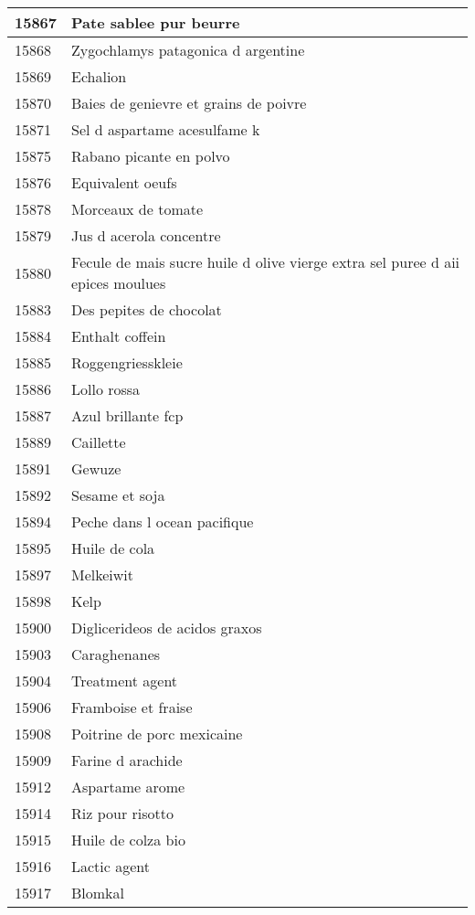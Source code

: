 \begin{longtable}{|l|l|}
15867 & Pate sablee pur beurre \\ \hline 
15868 & Zygochlamys patagonica d argentine \\ \hline 
15869 & Echalion \\ \hline 
15870 & Baies de genievre et grains de poivre \\ \hline 
15871 & Sel d aspartame acesulfame k \\ \hline 
15875 & Rabano picante en polvo \\ \hline 
15876 & Equivalent oeufs \\ \hline 
15878 & Morceaux de tomate \\ \hline 
15879 & Jus d acerola concentre \\ \hline 
15880 & Fecule de mais sucre huile d olive vierge extra sel puree d aii epices moulues \\ \hline 
15883 & Des pepites de chocolat \\ \hline 
15884 & Enthalt coffein \\ \hline 
15885 & Roggengriesskleie \\ \hline 
15886 & Lollo rossa \\ \hline 
15887 & Azul brillante fcp \\ \hline 
15889 & Caillette \\ \hline 
15891 & Gewuze \\ \hline 
15892 & Sesame et soja \\ \hline 
15894 & Peche dans l ocean pacifique \\ \hline 
15895 & Huile de cola \\ \hline 
15897 & Melkeiwit \\ \hline 
15898 & Kelp \\ \hline 
15900 & Diglicerideos de acidos graxos \\ \hline 
15903 & Caraghenanes \\ \hline 
15904 & Treatment agent \\ \hline 
15906 & Framboise et fraise \\ \hline 
15908 & Poitrine de porc mexicaine \\ \hline 
15909 & Farine d arachide \\ \hline 
15912 & Aspartame arome \\ \hline 
15914 & Riz pour risotto \\ \hline 
15915 & Huile de colza bio \\ \hline 
15916 & Lactic agent \\ \hline 
15917 & Blomkal \\ \hline 

\end{longtable}
